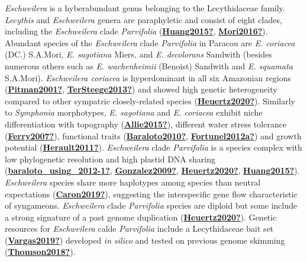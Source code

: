\documentclass[12pt,twoside,a4paper, a]{article}
\begin{document}
\emph{Eschweilera} is a hyberabundant genus belonging to the Lecythidaceae family.
\emph{Lecythis} and \emph{Eschweilera} genera are paraphyletic and consist of eight clades, including the \emph{Eschweilera} clade \emph{Parvifolia} (\protect\hyperlink{ref-Huang2015}{\textbf{Huang2015?}}, \protect\hyperlink{ref-Mori2016}{\textbf{Mori2016?}}).
Abundant species of the \emph{Eschweilera} clade \emph{Parvifolia} in Paracou are \emph{E. coriacea} (DC.) S.A.Mori, \emph{E. sagotiana} Miers, and \emph{E. decolorans} Sandwith (besides numerous others such as \emph{E. wachenheimii} (Benoist) Sandwith and \emph{E. squamata} S.A.Mori).
\emph{Eschweilera coriacea} is hyperdominant in all six Amazonian regions (\protect\hyperlink{ref-Pitman2001}{\textbf{Pitman2001?}}, \protect\hyperlink{ref-TerSteege2013}{\textbf{TerSteege2013?}}) and showed high genetic heterogeneity compared to other sympatric closely-related species (\protect\hyperlink{ref-Heuertz2020}{\textbf{Heuertz2020?}}).
Similarly to \emph{Symphonia} morphotypes, \emph{E. sagotiana} and \emph{E. coriacea} exhibit niche differentiation with topography (\protect\hyperlink{ref-Allie2015}{\textbf{Allie2015?}}), different water stress tolerance (\protect\hyperlink{ref-Ferry2007}{\textbf{Ferry2007?}}), functional traits (\protect\hyperlink{ref-Baraloto2010}{\textbf{Baraloto2010?}}, \protect\hyperlink{ref-Fortunel2012a}{\textbf{Fortunel2012a?}}) and growth potential (\protect\hyperlink{ref-Herault2011}{\textbf{Herault2011?}}).
\emph{Eschweilera} clade \emph{Parvifolia} is a species complex with low phylogenetic resolution and high plastid DNA sharing (\protect\hyperlink{ref-baraloto_using_2012-1}{\textbf{baraloto\_using\_2012-1?}}, \protect\hyperlink{ref-Gonzalez2009}{\textbf{Gonzalez2009?}}, \protect\hyperlink{ref-Heuertz2020}{\textbf{Heuertz2020?}}, \protect\hyperlink{ref-Huang2015}{\textbf{Huang2015?}}).
\emph{Eschweilera} species share more haplotypes among species than neutral expectations (\protect\hyperlink{ref-Caron2019}{\textbf{Caron2019?}}),
suggesting the interspecific gene flow characteristic of syngameons.
\emph{Eschweilera} clade \emph{Parvifolia} species are diploid but some include a strong signature of a past genome duplication (\protect\hyperlink{ref-Heuertz2020}{\textbf{Heuertz2020?}}).
Genetic resources for \emph{Eschweilera} calde \emph{Parvifolia} include a Lecythidaceae bait set (\protect\hyperlink{ref-Vargas2019}{\textbf{Vargas2019?}}) developed \emph{in silico} and tested on previous genome skimming (\protect\hyperlink{ref-Thomson2018}{\textbf{Thomson2018?}}).
\end{document}
